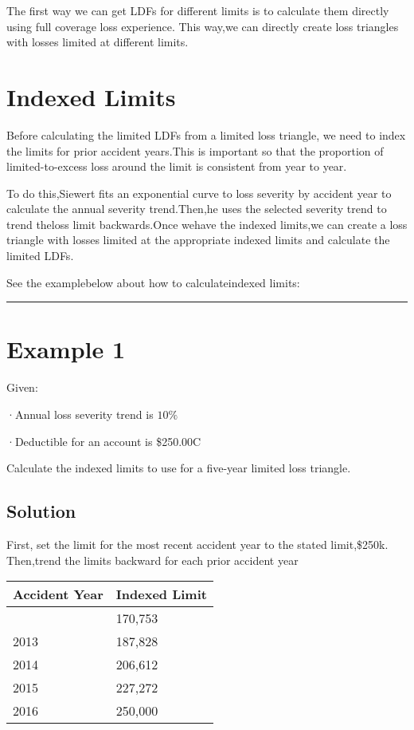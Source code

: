 \documentclass[
]{article}
\begin{document}
The first way we can get LDFs for different limits is to calculate them
directly using full coverage loss experience. This way,we can directly
create loss triangles with losses limited at different limits.

\section{Indexed Limits}\label{indexed-limits}

Before calculating the limited LDFs from a limited loss triangle, we
need to index the limits for prior accident years.This is important so
that the proportion of limited-to-excess loss around the limit is
consistent from year to year.

To do this,Siewert fits an exponential curve to loss severity by
accident year to calculate the annual severity trend.Then,he uses the
selected severity trend to trend theloss limit backwards.Once wehave the
indexed limits,we can create a loss triangle with losses limited at the
appropriate indexed limits and calculate the limited LDFs.

See the examplebelow about how to calculateindexed limits:

\begin{center}\rule{0.5\linewidth}{0.5pt}\end{center}

\section{Example 1}\label{example-1}

Given:

·Annual loss severity trend is \(10\%\)

·Deductible for an account is \$250.00C

Calculate the indexed limits to use for a five-year limited loss
triangle.

\subsection{Solution}\label{solution}

First, set the limit for the most recent accident year to the stated
limit,\$250k. Then,trend the limits backward for each prior accident
year

\begin{longtable}[]{@{}ll@{}}
\toprule\noalign{}
Accident Year & Indexed Limit \\
\midrule\noalign{}
\endhead
\bottomrule\noalign{}
\endlastfoot
2012 & 170,753 \\
2013 & 187,828 \\
2014 & 206,612 \\
2015 & 227,272 \\
2016 & 250,000 \\
\end{longtable}
\end{document}
